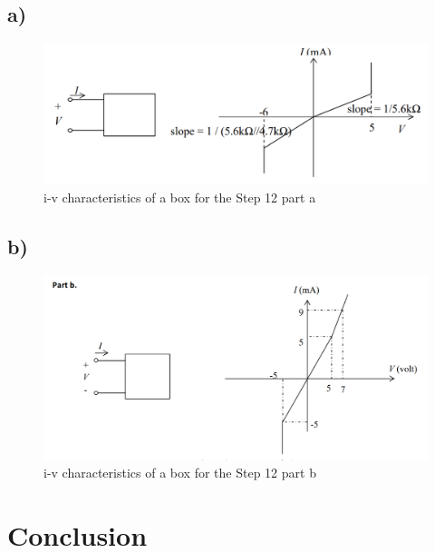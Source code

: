 \documentclass[letterpaper,12pt]{article}
\begin{document}
\subsection{a)}
\begin{figure}[H]
    \centering
   \includegraphics[width=1\textwidth]{12_1.png}
   \caption{i-v characteristics of a box for the Step 12 part a}
\end{figure} 

\subsection{b)}
\begin{figure}[H]
    \centering
   \includegraphics[width=1\textwidth]{12_2.png}
   \caption{i-v characteristics of a box for the Step 12 part b}
\end{figure} 
\fi
\section{Conclusion}
\end{document}
